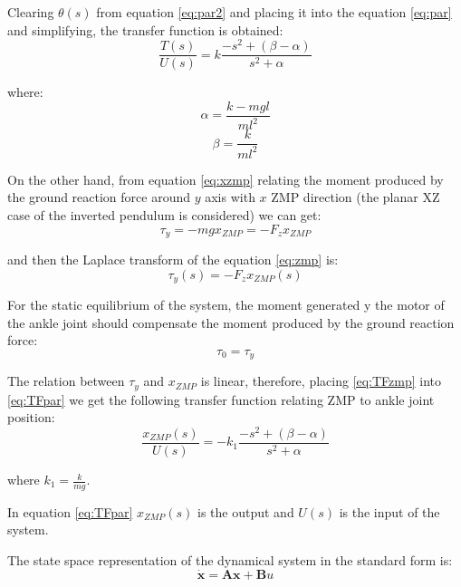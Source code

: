 Clearing $\theta(s)$ from equation \eqref{eq:par2} and placing it into the equation \eqref{eq:par} and simplifying, the transfer function is obtained:
\begin{equation}
\frac{T(s)}{U(s)} = k \frac{-s^2+(\beta - \alpha)}{s^2 + \alpha}
\label{eq:TFpar}
\end{equation}

where:
\begin{equation}
\alpha = \frac{k-mgl}{ml^2}
\end{equation}
\begin{equation}
\beta = \frac{k}{ml^2}
\end{equation}

On the other hand, from equation \eqref{eq:xzmp} relating the moment produced by the ground reaction force around $y$ axis with $x$ ZMP direction (the planar XZ case of the inverted pendulum is considered) we can get:
\begin{equation}
\tau_y = -mgx_{ZMP} = - F_z x_{ZMP}
\label{eq:zmp}
\end{equation} 

and then the Laplace transform of the equation \eqref{eq:zmp} is:
\begin{equation}
\tau_y(s) = - F_z x_{ZMP}(s)
\label{eq:TFzmp}
\end{equation}

For the static equilibrium of the system, the moment generated y the motor of the ankle joint should compensate the moment produced by the ground reaction force:
\begin{equation}
\tau_0 = \tau_y
\end{equation}

The relation between $\tau_y$ and $x_{ZMP}$ is linear, therefore, placing \eqref{eq:TFzmp} into \eqref{eq:TFpar} we get the following transfer function relating ZMP to ankle joint position: 
\begin{equation}
\frac{x_{ZMP}(s)}{U(s)} = - k_1 \frac{-s^2+(\beta - \alpha)}{s^2 + \alpha}
\end{equation}

where $k_1 = \frac{k}{mg}$.

In equation \eqref{eq:TFpar} $x_{ZMP}(s)$ is the output and $U(s)$ is the input of the system.

The state space representation of the dynamical system in the standard form is:
\begin{equation}
\mathbf{\dot{x}} = \mathbf{A}\textbf{x} + \mathbf{B}u
\label{eq:ss1}
\end{equation}

